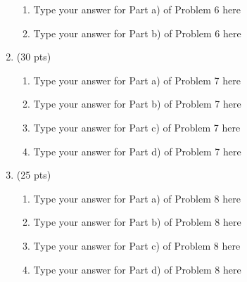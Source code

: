 \documentclass[11pt]{article}
\begin{document}
\begin{enumerate}
        \begin{enumerate}

             \item Type your answer for Part a) of Problem 6 here

             \vskip 06pt
             \item Type your answer for Part b) of Problem 6 here


        \end{enumerate}


    \item \label{Problem_07} (30 pts)

        \begin{enumerate}

             \item Type your answer for Part a) of Problem 7 here

             \vskip 06pt
             \item Type your answer for Part b) of Problem 7 here

             \vskip 06pt
             \item Type your answer for Part c) of Problem 7 here

             \vskip 06pt
             \item Type your answer for Part d) of Problem 7 here

        \end{enumerate}


    \item \label{Problem_08} (25 pts)

        \begin{enumerate}

             \item Type your answer for Part a) of Problem 8 here

             \vskip 06pt
             \item Type your answer for Part b) of Problem 8 here

             \vskip 06pt
             \item Type your answer for Part c) of Problem 8 here

             \vskip 06pt
             \item Type your answer for Part d) of Problem 8 here

        \end{enumerate}


\end{enumerate}
\end{document}
